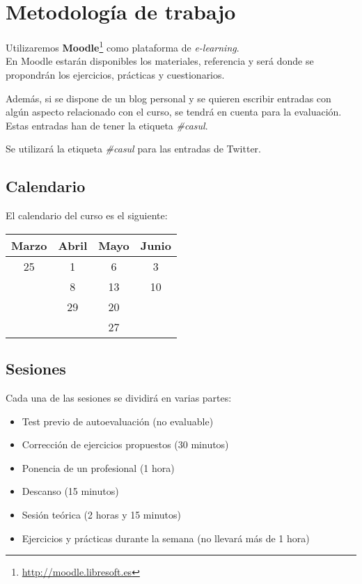 \documentclass[a4paper]{article}
\begin{document}
  \section{Metodología de trabajo}
  Utilizaremos \textbf{Moodle}\footnote{\url{http://moodle.libresoft.es}} como plataforma de \textit{e-learning}.\\
  En Moodle estarán disponibles los materiales, referencia y será donde se propondrán los ejercicios, prácticas y cuestionarios.

  Además, si se dispone de un blog personal y se quieren escribir entradas con algún aspecto relacionado con el curso, se tendrá en cuenta para la evaluación. Estas entradas han de tener la etiqueta \textit{\#casul}.

  Se utilizará la etiqueta \textit{\#casul} para las entradas de Twitter.
    
    \subsection{Calendario}
    El calendario del curso es el siguiente: 

    \medskip

    \begin{tabular}{| c | c | c | c |}
      \hline
      Marzo & Abril & Mayo & Junio \\
      \hline
      25 & 1 & 6 & 3 \\
      & 8 & 13 & 10 \\
      & 29 & 20 & \\
      & & 27 & \\
      \hline
    \end{tabular}

    \subsection{Sesiones}
      Cada una de las sesiones se dividirá en varias partes:
      \begin{itemize}
        \item Test previo de autoevaluación (no evaluable)
        \item Corrección de ejercicios propuestos (30 minutos)
        \item Ponencia de un profesional (1 hora)
        \item Descanso (15 minutos)
        \item Sesión teórica (2 horas y 15 minutos)
        \item Ejercicios y prácticas durante la semana (no llevará más de 1 hora)
      \end{itemize}
\end{document}
